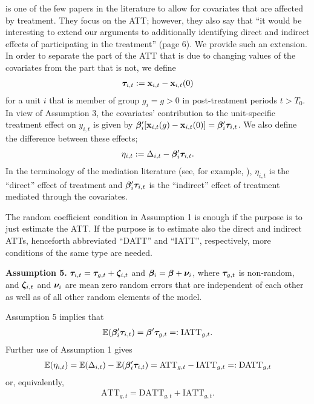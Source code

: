 \documentclass[12pt,fleqn]{article}
\begin{document}
  \citet{Caetano_Callaway_Payne_Rodrigues_2022} is one of the few papers in the literature to allow for covariates that are affected by treatment. They focus on the ATT; however, they also say that ``it would be interesting to extend our arguments to additionally identifying direct and indirect effects of participating in the treatment'' (page 6). We provide such an extension. In order to separate the part of the ATT that is due to changing values of the covariates from the part that is not, we define
  \begin{align}
  \boldsymbol{\tau}_{i,t} := \mathbf{x}_{i,t} - \mathbf{x}_{i,t}(0)
  \end{align}
  for a unit $i$ that is member of group $g_i = g > 0$ in post-treatment periods $t > T_0$. In view of Assumption 3, the covariates' contribution to the unit-specific treatment effect on $y_{i,t}$ is given by $\boldsymbol{\beta}_i'[\mathbf{x}_{i,t}(g) - \mathbf{x}_{i,t}(0)] = \boldsymbol{\beta}_i'\boldsymbol{\tau}_{i,t}$. We also define the difference between these effects;
  \begin{align}
  \eta_{i,t} :=  \Delta_{i,t} - \boldsymbol{\beta}_i'\boldsymbol{\tau}_{i,t}.
  \end{align}
  In the terminology of the mediation literature (see, for example, \citealp{huber2014identifying}), $\eta_{i,t}$ is the ``direct'' effect of treatment and $\boldsymbol{\beta}_i'\boldsymbol{\tau}_{i,t}$ is the ``indirect'' effect of treatment mediated through the covariates.
  
  The random coefficient condition in Assumption 1 is enough if the purpose is to just estimate the ATT. If the purpose is to estimate also the direct and indirect ATTs, henceforth abbreviated ``DATT'' and ``IATT'', respectively, more conditions of the same type are needed.
  
  \bigskip
  
  \noindent \textbf{Assumption 5.} $\boldsymbol{\tau}_{i,t}= \boldsymbol{\tau}_{g,t} + \boldsymbol{\zeta}_{i,t}$ and $\boldsymbol{\beta}_{i} = \boldsymbol{\beta} + \boldsymbol{\nu}_i$, where $\boldsymbol{\tau}_{g,t}$ is non-random, and $\boldsymbol{\zeta}_{i,t}$ and $\boldsymbol{\nu}_i$ are mean zero random errors that are independent of each other as well as of all other random elements of the model.
  
  \bigskip
  
  Assumption 5 implies that
  \begin{align}
  \mathbb{E}(\boldsymbol{\beta}_i'\boldsymbol{\tau}_{i,t}) = \boldsymbol{\beta}'\boldsymbol{\tau}_{g,t} =: \mathrm{IATT}_{g,t}.
  \end{align}
  Further use of Assumption 1 gives
  \begin{align}
  \mathbb{E}(\eta_{i,t}) = \mathbb{E}(\Delta_{i,t}) - \mathbb{E}(\boldsymbol{\beta}_i'\boldsymbol{\tau}_{i,t}) = \mathrm{ATT}_{g,t} - \mathrm{IATT}_{g,t} =: \mathrm{DATT}_{g,t}
  \end{align}
  or, equivalently,
  \begin{align}
  \mathrm{ATT}_{g,t} = \mathrm{DATT}_{g,t} + \mathrm{IATT}_{g,t}.
  \end{align}
  
\end{document}
